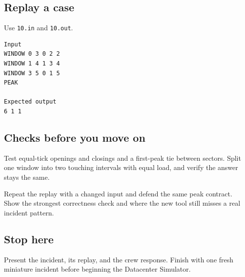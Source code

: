 \documentclass[11pt,letterpaper]{article}
\begin{document}
\subsection*{Replay a case}

Use \texttt{10.in} and \texttt{10.out}.

\begin{samepage}
\small
\begin{verbatim}
Input
WINDOW 0 3 0 2 2
WINDOW 1 4 1 3 4
WINDOW 3 5 0 1 5
PEAK

Expected output
6 1 1
\end{verbatim}
\end{samepage}

\subsection*{Checks before you move on}

Test equal-tick openings and closings and a first-peak tie between sectors. Split one window into two touching intervals with equal load, and verify the answer stays the same.

Repeat the replay with a changed input and defend the same peak contract. Show the strongest correctness check and where the new tool still misses a real incident pattern.

\subsection*{Stop here}

Present the incident, its replay, and the crew response. Finish with one fresh miniature incident before beginning the Datacenter Simulator.
\end{document}
